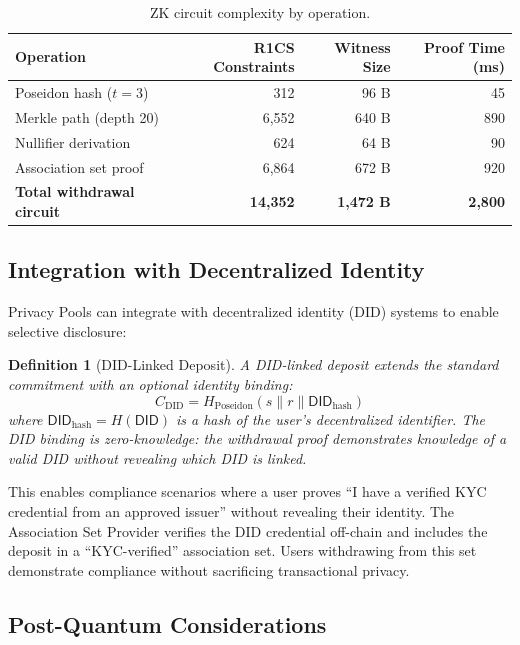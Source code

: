 \documentclass[11pt,a4paper]{article}
\newtheorem{definition}{Definition}
\begin{document}
\begin{table}[H]
\centering
\caption{ZK circuit complexity by operation.}
\label{tab:circuitcomplexity}
\begin{tabular}{lrrr}
\toprule
\textbf{Operation} & \textbf{R1CS Constraints} & \textbf{Witness Size} & \textbf{Proof Time (ms)} \\
\midrule
Poseidon hash ($t=3$) & 312 & 96 B & 45 \\
Merkle path (depth 20) & 6,552 & 640 B & 890 \\
Nullifier derivation & 624 & 64 B & 90 \\
Association set proof & 6,864 & 672 B & 920 \\
\midrule
\textbf{Total withdrawal circuit} & \textbf{14,352} & \textbf{1,472 B} & \textbf{2,800} \\
\bottomrule
\end{tabular}
\end{table}

\subsection{Integration with Decentralized Identity}

Privacy Pools can integrate with decentralized identity (DID) systems to enable selective disclosure:

\begin{definition}[DID-Linked Deposit]
A DID-linked deposit extends the standard commitment with an optional identity binding:
\begin{equation}
    C_{\text{DID}} = H_{\text{Poseidon}}(s \| r \| \mathsf{DID}_{\text{hash}})
\end{equation}
where $\mathsf{DID}_{\text{hash}} = H(\mathsf{DID})$ is a hash of the user's decentralized identifier. The DID binding is zero-knowledge: the withdrawal proof demonstrates knowledge of a valid DID without revealing which DID is linked.
\end{definition}

This enables compliance scenarios where a user proves ``I have a verified KYC credential from an approved issuer'' without revealing their identity. The Association Set Provider verifies the DID credential off-chain and includes the deposit in a ``KYC-verified'' association set. Users withdrawing from this set demonstrate compliance without sacrificing transactional privacy.

\subsection{Post-Quantum Considerations}
\end{document}
